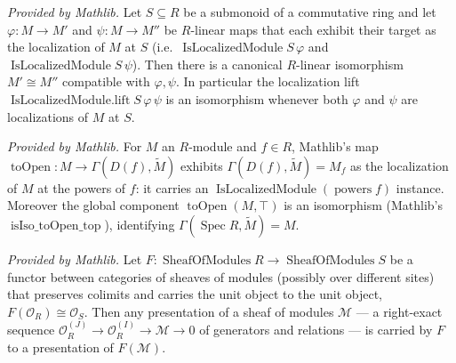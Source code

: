 \begin{lemma}
  \label{lem:isLocalizedModule_linearEquiv_mathlib}
  \mathlibok
  \textit{Provided by Mathlib.}
  Let \(S \subseteq R\) be a submonoid of a commutative ring and let \(\varphi : M \to M'\) and
  \(\psi : M \to M''\) be \(R\)-linear maps that each exhibit their target as the localization of
  \(M\) at \(S\) (i.e.\ \(\operatorname{IsLocalizedModule} S\, \varphi\) and
  \(\operatorname{IsLocalizedModule} S\, \psi\)). Then there is a canonical \(R\)-linear isomorphism
  \(M' \cong M''\) compatible with \(\varphi, \psi\). In particular the localization lift
  \(\operatorname{IsLocalizedModule.lift} S\, \varphi\, \psi\) is an isomorphism whenever both
  \(\varphi\) and \(\psi\) are localizations of \(M\) at \(S\).
\end{lemma}


\begin{lemma}
  \label{lem:tilde_toOpen_isLocalizedModule_mathlib}
  \mathlibok
  \textit{Provided by Mathlib.}
  For \(M\) an \(R\)-module and \(f \in R\), Mathlib's map
  \(\operatorname{toOpen} : M \to \Gamma(D(f), \widetilde{M})\) exhibits \(\Gamma(D(f), \widetilde{M}) =
  M_f\) as the localization of \(M\) at the powers of \(f\): it carries an
  \(\operatorname{IsLocalizedModule}(\operatorname{powers} f)\) instance. Moreover the global component
  \(\operatorname{toOpen}(M, \top)\) is an isomorphism (Mathlib's
  \(\operatorname{isIso\_toOpen\_top}\)), identifying \(\Gamma(\operatorname{Spec} R, \widetilde{M}) =
  M\).
\end{lemma}

\begin{lemma}
  \label{lem:presentation_map_mathlib}
  \mathlibok
  \textit{Provided by Mathlib.}
  Let \(F : \operatorname{SheafOfModules} R \to \operatorname{SheafOfModules} S\) be a functor between
  categories of sheaves of modules (possibly over different sites) that preserves colimits and carries
  the unit object to the unit object, \(F(\mathcal{O}_R) \cong \mathcal{O}_S\). Then any presentation
  of a sheaf of modules \(\mathcal{M}\) — a right-exact sequence
  \(\mathcal{O}_R^{(J)} \to \mathcal{O}_R^{(I)} \to \mathcal{M} \to 0\) of generators and relations —
  is carried by \(F\) to a presentation of \(F(\mathcal{M})\).
\end{lemma}

